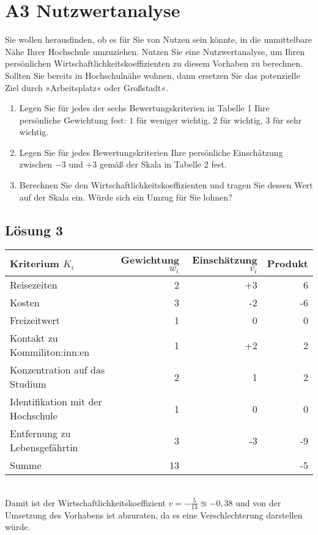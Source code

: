 \documentclass[main.tex]{subfiles}
\begin{document}
\section{A3 Nutzwertanalyse}

Sie wollen herausfinden, ob es für Sie von Nutzen sein könnte, in die unmittelbare Nähe Ihrer Hochschule umzuziehen. Nutzen Sie eine Nutzwertanalyse, um Ihren persönlichen Wirtschaftlichkeitskoeffizienten zu diesem Vorhaben zu berechnen. Sollten Sie bereits in Hochschulnähe wohnen, dann ersetzen Sie das potenzielle Ziel durch »Arbeitsplatz« oder Großstadt«.

\begin{enumerate}
\item Legen Sie für jedes der sechs Bewertungskriterien in Tabelle 1 Ihre persönliche Gewichtung fest: $1$ für weniger wichtig, $2$ für wichtig, $3$ für sehr wichtig.
\item Legen Sie für jedes Bewertungskriterien Ihre persönliche Einschätzung zwischen $-3$ und $+3$ gemäß der Skala in Tabelle 2 fest.
\item Berechnen Sie den Wirtschaftlichkeitskoeffizienten und tragen Sie dessen Wert auf der Skala ein. Würde sich ein Umzug für Sie lohnen?
\end{enumerate}

\subsection{Lösung 3}

\begin{tabular}{|l|r|r|r|} \hline
Kriterium $K_i$                     & Gewichtung $w_i$ & Einschätzung $v_i$ & Produkt \\
\hline
Reisezeiten                         &                2 &                 +3 &   6 \\
Kosten                              &                3 &                 -2 &  -6 \\
Freizeitwert                        &                1 &                  0 &   0 \\
Kontakt zu Kommiliton:inn:en        &                1 &                 +2 &   2 \\
Konzentration auf das Studium       &                2 &                  1 &   2 \\
Identifikation mit der Hochschule   &                1 &                  0 &   0 \\
Entfernung zu Lebensgefährtin       &                3 &                 -3 &  -9 \\
\hline
Summe                               &               13 &                    &  -5 \\
\hline
\end{tabular}\\

Damit ist der Wirtschaftlichkeitskoeffizient $v = -\frac{5}{13} \approxeq -0,38$ und von der Umsetzung des Vorhabens ist abzuraten, da es eine Verschlechterung darstellen würde.
\end{document}
